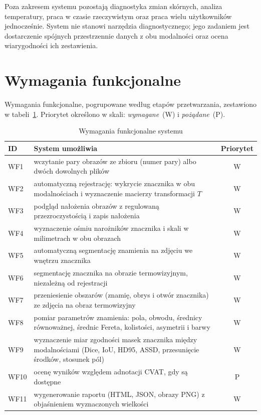 Poza zakresem systemu pozostają diagnostyka zmian skórnych, analiza temperatury, praca w czasie rzeczywistym oraz praca wielu użytkowników jednocześnie. System nie stanowi narzędzia diagnostycznego; jego zadaniem jest dostarczenie spójnych przestrzennie danych z obu modalności oraz ocena wiarygodności ich zestawienia.

\section{Wymagania funkcjonalne}
\label{sec:wymagania-f}

Wymagania funkcjonalne, pogrupowane według etapów przetwarzania, zestawiono w tabeli~\ref{tab:wf}. Priorytet określono w skali: \emph{wymagane}~(W) i \emph{pożądane}~(P).

\begin{table}[htbp]
  \centering
  \caption{Wymagania funkcjonalne systemu}
  \label{tab:wf}
  \small
  \begin{tabularx}{\textwidth}{l X c}
    \toprule
    ID & System umożliwia & Priorytet \\
    \midrule
    WF1 & wczytanie pary obrazów ze zbioru (numer pary) albo dwóch dowolnych plików & W \\
    WF2 & automatyczną rejestrację: wykrycie znacznika w obu modalnościach i wyznaczenie macierzy transformacji $T$ & W \\
    WF3 & podgląd nałożenia obrazów z regulowaną przezroczystością i zapis nałożenia & W \\
    WF4 & wyznaczenie ośmiu narożników znacznika i skali w milimetrach w obu obrazach & W \\
    WF5 & automatyczną segmentację znamienia na zdjęciu we wnętrzu znacznika & W \\
    WF6 & segmentację znacznika na obrazie termowizyjnym, niezależną od rejestracji & W \\
    WF7 & przeniesienie obszarów (znamię, obrys i otwór znacznika) ze zdjęcia na obraz termowizyjny & W \\
    WF8 & pomiar parametrów znamienia: pola, obwodu, średnicy równoważnej, średnic Fereta, kolistości, asymetrii i barwy & W \\
    WF9 & wyznaczenie miar zgodności masek znacznika między modalnościami (Dice, IoU, HD95, ASSD, przesunięcie środków, stosunek pól) & W \\
    WF10 & ocenę wyników względem adnotacji CVAT, gdy są dostępne & P \\
    WF11 & wygenerowanie raportu (HTML, JSON, obrazy PNG) z objaśnieniem wyznaczonych wielkości & W \\

\end{tabularx}
\end{table}
